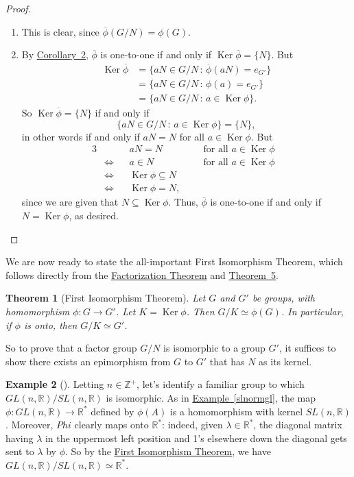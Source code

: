 \documentclass[10pt,]{book}
\theoremstyle{plain}
\newtheorem{theorem}{Theorem}[section]
\theoremstyle{definition}
\theoremstyle{definition}
\theoremstyle{definition}
\newtheorem{example}[theorem]{Example}
\theoremstyle{definition}
\numberwithin{equation}{section}
\def\Z{\mathbb{Z}}
\def\R{\mathbb{R}}
\def\phibar{\overline{\phi}}
\DeclareMathOperator{\Ker}{Ker}
\newcommand{\amp}{&}
\begin{document}
\begin{proof}\hypertarget{proof-52}{}
\leavevmode%
\begin{enumerate}
\item\hypertarget{li-511}{}This is clear, since \(\phibar(G/N)=\phi(G)\).%
\item\hypertarget{li-512}{}By \hyperref[kerone]{Corollary~2}, \(\phibar\) is one-to-one if and only if \(\Ker
\phibar=\{N\}\).  But%
\begin{align*}
\Ker \phibar\amp =\{aN\in G/N
\,:\, \phibar(aN)=e_{G'}\}\\
\amp =\{aN\in G/N \,:\,
\phi(a)=e_{G'}\}\\
\amp =\{aN\in G/N \,:\, a\in
\Ker\phi\}.
\end{align*}
So \(\Ker \phibar = \{N\}\) if and only if%
\begin{equation*}
\{aN\in G/N\,:\,a\in \Ker\phi\}=\{N\},
\end{equation*}
in other words if and only if \(aN=N\) for all \(a\in \Ker\phi\).  But%
\begin{align*}
{3}
\amp \amp \amp aN=N \amp \amp \ \ \text{ for all \(a\in \Ker\phi\) }\\
\amp \Leftrightarrow  \amp \amp  a\in N \amp \amp \ \ \text{ for all \(a\in \Ker\phi\) }\\
\amp \Leftrightarrow  \amp \amp  \Ker \phi\subseteq N\amp \amp\\
\amp \Leftrightarrow  \amp \amp  \Ker\phi=N,\amp \amp
\end{align*}
since we are given that \(N\subseteq \Ker \phi\). Thus, \(\phibar\) is one-to-one if and only if \(N=\Ker\phi\), as desired.%
\end{enumerate}
\end{proof}
We are now ready to state the all-important First Isomorphism Theorem, which follows directly from the \hyperref[facthm]{Factorization Theorem}  and \hyperref[epimono]{Theorem~5}.%
\begin{theorem}[{First Isomorphism Theorem}]\label{fit}
Let \(G\) and \(G'\) be groups, with homomorphism \(\phi:G \rightarrow G'\). Let \(K=\Ker
\phi\). Then \(G/K \simeq \phi(G)\). In particular, if \(\phi\) is onto, then \(G/K\simeq G'\).%
\end{theorem}
So to prove that a factor group \(G/N\) is isomorphic to a group \(G'\), it suffices to show there exists an epimorphism from \(G\) to \(G'\) that has \(N\) as its kernel.%
\begin{example}[]\label{example-86}
Letting \(n\in \Z^+\), let's identify a familiar group to which \(GL(n,\R)/SL(n,\R)\) is isomorphic. As in \hyperref[slnormgl]{Example~\ref{slnormgl}}, the map \(\phi:GL(n,\R)\to \R^*\) defined by \(\phi(A)\) is a homomorphism with kernel \(SL(n,\R)\). Moreover, \(Phi\) clearly maps onto \(\R^*\): indeed, given \(\lambda \in
\R^*\), the diagonal matrix having \(\lambda\) in the uppermost left position and 1's elsewhere down the diagonal gets sent to \(\lambda\) by \(\phi\). So by the \hyperref[fit]{First Isomorphism Theorem}, we have \(GL(n,\R)/SL(n,\R) \simeq \R^*\).%
\end{example}
\end{document}
